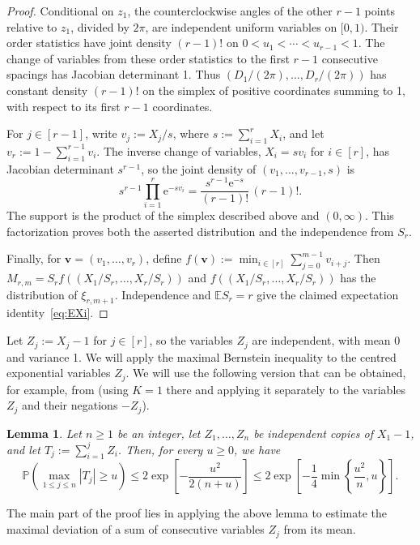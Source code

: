 \documentclass[10pt,a4paper]{article}
\numberwithin{equation}{section}
\newtheorem{lemma}[theorem]{Lemma}
\theoremstyle{definition}
\theoremstyle{remark}
\newcommand{\V}[1]{\boldsymbol{#1}}
\newcommand{\me}{\mathrm{e}}
\begin{document}
\begin{proof}
Conditional on $z_1$, the counterclockwise angles of the other $r-1$ points relative to $z_1$, divided by $2\pi$, are independent uniform variables on $[0,1)$. Their order statistics have joint density $(r-1)!$ on $0<u_1<\cdots<u_{r-1}<1$. The change of variables from these order statistics to the first $r-1$ consecutive spacings has Jacobian determinant 1. Thus $(D_1/(2\pi),\ldots,D_r/(2\pi))$ has constant density $(r-1)!$ on the simplex of positive coordinates summing to 1, with respect to its first $r-1$ coordinates.

For $j\in[r-1]$, write $v_j:=X_j/s$, where $s:=\sum_{i=1}^r X_i$, and let $v_r:=1-\sum_{i=1}^{r-1}v_i$. The inverse change of variables, $X_i=sv_i$ for $i\in[r]$, has Jacobian determinant $s^{r-1}$, so the joint density of $(v_1,\ldots,v_{r-1},s)$ is
\[
 s^{r-1}\prod_{i=1}^r \me^{-sv_i}
 =\frac{s^{r-1}\me^{-s}}{(r-1)!}\,(r-1)!.
\]
The support is the product of the simplex described above and $(0,\infty)$. This factorization proves both the asserted distribution and the independence from $S_r$. 

Finally, for $\V{v}=(v_1,\ldots,v_r)$, define $f(\V{v}):=\min_{i\in[r]}\sum_{j=0}^{m-1}v_{i+j}$. Then $M_{r,m}=S_rf((X_1/S_r,\ldots,X_r/S_r))$ and $f((X_1/S_r,\ldots,X_r/S_r))$ has the distribution of $\xi_{r,m+1}$. Independence and $\mathbb E S_r=r$ give the claimed expectation identity~\eqref{eq:EXi}.
\end{proof}


Let $Z_j:=X_j-1$ for $j\in [r]$, so the variables $Z_j$ are independent, with mean 0 and variance 1. We will apply the maximal Bernstein inequality
to the centred exponential variables $Z_j$. We will use the following version that can be obtained, for example, from \cite[Theorem B.2]{Rio17atwdrp} (using $K=1$ there and applying it separately to the variables $Z_j$ and their negations $-Z_j$).

\begin{lemma}\label{lem:partial-max}
Let $n\ge1$ be an integer, let $Z_1,\ldots,Z_n$ be independent copies of $X_1-1$, and let $T_j:=\sum_{i=1}^jZ_i$.  Then, for every $u\ge0$, we have
\begin{equation*}
 \mathbb{P}\left(\max_{1\le j\le n}|T_j|\ge u\right)
 \le 2\exp\left[ -\frac{u^2}{2(n+u)}\right]
 \le 2\exp\left[-\frac14\min\left\{\frac{u^2}{n},u\right\}\right].
\end{equation*}
\end{lemma}


The main part of the proof lies in applying the above lemma to estimate the maximal deviation of a sum of consecutive variables $Z_j$ from its mean.
\end{document}
